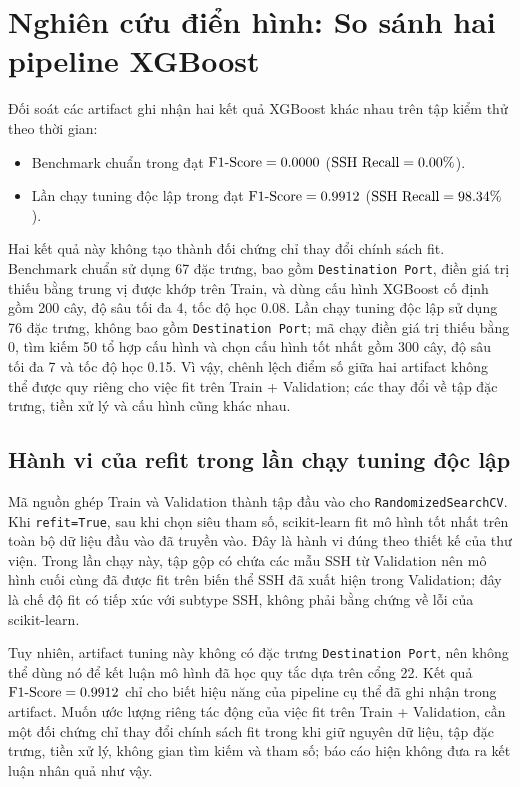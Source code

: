 
\section{Nghiên cứu điển hình: So sánh hai pipeline XGBoost}
\label{sec:results_refit}

Đối soát các artifact ghi nhận hai kết quả XGBoost khác nhau trên tập kiểm thử theo thời gian:
\begin{itemize}
    \item Benchmark chuẩn trong  đạt $\text{F1-Score} = 0.0000$ ($\text{SSH Recall} = 0.00\%$).
    \item Lần chạy tuning độc lập trong  đạt $\text{F1-Score} = 0.9912$ ($\text{SSH Recall} = 98.34\%$).
\end{itemize}

Hai kết quả này không tạo thành đối chứng chỉ thay đổi chính sách fit. Benchmark chuẩn sử dụng 67 đặc trưng, bao gồm \texttt{Destination Port}, điền giá trị thiếu bằng trung vị được khớp trên Train, và dùng cấu hình XGBoost cố định gồm 200 cây, độ sâu tối đa 4, tốc độ học 0.08. Lần chạy tuning độc lập sử dụng 76 đặc trưng, không bao gồm \texttt{Destination Port}; mã chạy điền giá trị thiếu bằng 0, tìm kiếm 50 tổ hợp cấu hình và chọn cấu hình tốt nhất gồm 300 cây, độ sâu tối đa 7 và tốc độ học 0.15. Vì vậy, chênh lệch điểm số giữa hai artifact không thể được quy riêng cho việc fit trên Train + Validation; các thay đổi về tập đặc trưng, tiền xử lý và cấu hình cũng khác nhau.

\subsection{Hành vi của refit trong lần chạy tuning độc lập}
Mã nguồn  ghép Train và Validation thành tập đầu vào cho \texttt{RandomizedSearchCV}. Khi \texttt{refit=True}, sau khi chọn siêu tham số, scikit-learn fit mô hình tốt nhất trên toàn bộ dữ liệu đầu vào đã truyền vào. Đây là hành vi đúng theo thiết kế của thư viện. Trong lần chạy này, tập gộp có chứa các mẫu SSH từ Validation nên mô hình cuối cùng đã được fit trên biến thể SSH đã xuất hiện trong Validation; đây là chế độ fit có tiếp xúc với subtype SSH, không phải bằng chứng về lỗi của scikit-learn.

Tuy nhiên, artifact tuning này không có đặc trưng \texttt{Destination Port}, nên không thể dùng nó để kết luận mô hình đã học quy tắc dựa trên cổng 22. Kết quả $\text{F1-Score} = 0.9912$ chỉ cho biết hiệu năng của pipeline cụ thể đã ghi nhận trong artifact. Muốn ước lượng riêng tác động của việc fit trên Train + Validation, cần một đối chứng chỉ thay đổi chính sách fit trong khi giữ nguyên dữ liệu, tập đặc trưng, tiền xử lý, không gian tìm kiếm và tham số; báo cáo hiện không đưa ra kết luận nhân quả như vậy.

